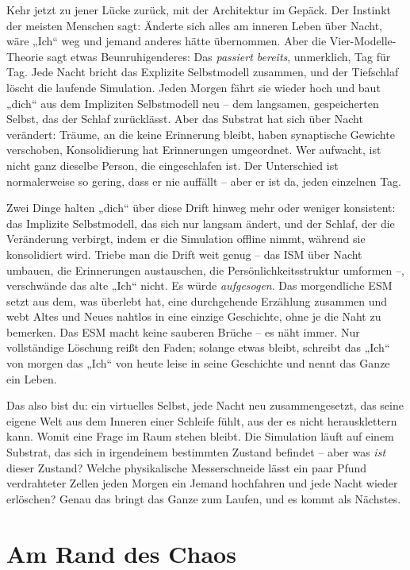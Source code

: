\documentclass[11pt, twoside, openright]{book}
\begin{document}
Kehr jetzt zu jener Lücke zurück, mit der Architektur im Gepäck. Der Instinkt der meisten Menschen sagt: Änderte sich alles am inneren Leben über Nacht, wäre „Ich“ weg und jemand anderes hätte übernommen. Aber die Vier-Modelle-Theorie sagt etwas Beunruhigenderes: Das \textit{passiert bereits}, unmerklich, Tag für Tag. Jede Nacht bricht das Explizite Selbstmodell zusammen, und der Tiefschlaf löscht die laufende Simulation. Jeden Morgen fährt sie wieder hoch und baut „dich“ aus dem Impliziten Selbstmodell neu -- dem langsamen, gespeicherten Selbst, das der Schlaf zurücklässt. Aber das Substrat hat sich über Nacht verändert: Träume, an die keine Erinnerung bleibt, haben synaptische Gewichte verschoben, Konsolidierung hat Erinnerungen umgeordnet. Wer aufwacht, ist nicht ganz dieselbe Person, die eingeschlafen ist. Der Unterschied ist normalerweise so gering, dass er nie auffällt -- aber er ist da, jeden einzelnen Tag.

Zwei Dinge halten „dich“ über diese Drift hinweg mehr oder weniger konsistent: das Implizite Selbstmodell, das sich nur langsam ändert, und der Schlaf, der die Veränderung verbirgt, indem er die Simulation offline nimmt, während sie konsolidiert wird. Triebe man die Drift weit genug -- das ISM über Nacht umbauen, die Erinnerungen austauschen, die Persönlichkeitsstruktur umformen --, verschwände das alte „Ich“ nicht. Es würde \textit{aufgesogen}. Das morgendliche ESM setzt aus dem, was überlebt hat, eine durchgehende Erzählung zusammen und webt Altes und Neues nahtlos in eine einzige Geschichte, ohne je die Naht zu bemerken. Das ESM macht keine sauberen Brüche -- es näht immer. Nur vollständige Löschung reißt den Faden; solange etwas bleibt, schreibt das „Ich“ von morgen das „Ich“ von heute leise in seine Geschichte und nennt das Ganze ein Leben.

Das also bist du: ein virtuelles Selbst, jede Nacht neu zusammengesetzt, das seine eigene Welt aus dem Inneren einer Schleife fühlt, aus der es nicht herausklettern kann. Womit eine Frage im Raum stehen bleibt. Die Simulation läuft auf einem Substrat, das sich in irgendeinem bestimmten Zustand befindet -- aber was \textit{ist} dieser Zustand? Welche physikalische Messerschneide lässt ein paar Pfund verdrahteter Zellen jeden Morgen ein Jemand hochfahren und jede Nacht wieder erlöschen? Genau das bringt das Ganze zum Laufen, und es kommt als Nächstes.

\chapter{Am Rand des Chaos}
\end{document}
